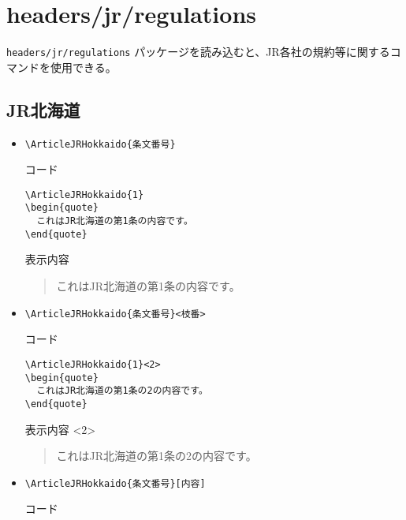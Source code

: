 \documentclass[oneside,10pt,a4paper]{jsarticle}
\begin{document}
  \section{headers/jr/regulations}

  \verb|headers/jr/regulations| パッケージを読み込むと、JR各社の規約等に関するコマンドを使用できる。

  \subsection{JR北海道}

  \begin{itemize}
    \item \verb|\ArticleJRHokkaido{条文番号}|
      \begin{itembox}[l]{コード}
        {\footnotesize\begin{verbatim}
\ArticleJRHokkaido{1}
\begin{quote}
  これはJR北海道の第1条の内容です。
\end{quote}\end{verbatim}}
      \end{itembox}
      \begin{itembox}[l]{表示内容}
        \begin{quote}
          これはJR北海道の第1条の内容です。
        \end{quote}
      \end{itembox}
    \item \verb|\ArticleJRHokkaido{条文番号}<枝番>|
      \begin{itembox}[l]{コード}
        {\footnotesize\begin{verbatim}
\ArticleJRHokkaido{1}<2>
\begin{quote}
  これはJR北海道の第1条の2の内容です。
\end{quote}\end{verbatim}}
      \end{itembox}
      \begin{itembox}[l]{表示内容}
        <2>
        \begin{quote}
          これはJR北海道の第1条の2の内容です。
        \end{quote}
      \end{itembox}
    \newpage
    \item \verb|\ArticleJRHokkaido{条文番号}[内容]|
      \begin{itembox}[l]{コード}
        {\footnotesize\begin{verbatim}

\end{verbatim}}
\end{itembox}
\end{itemize}
\end{document}
